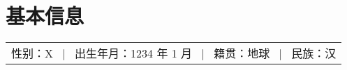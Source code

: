 \section*{基本信息}

\begin{tabular}{p{\textwidth}}
性别：X \, | \, 出生年月：1234 年 1 月 \, | \, 籍贯：地球 \, | \, 民族：汉
\end{tabular}